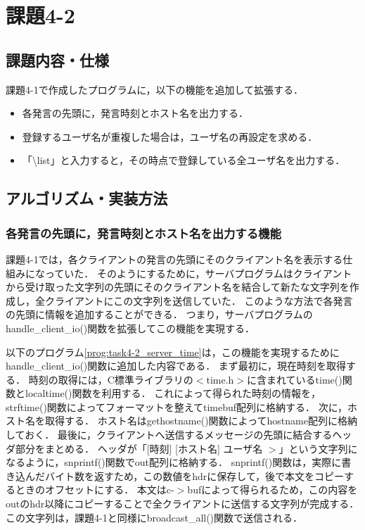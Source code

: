 \documentclass[a4j,10pt]{jarticle}
\begin{document}
\section{課題4-2}
\subsection{課題内容・仕様}
課題4-1で作成したプログラムに，以下の機能を追加して拡張する．
\begin{itemize}
  \item 各発言の先頭に，発言時刻とホスト名を出力する．
  \item 登録するユーザ名が重複した場合は，ユーザ名の再設定を求める．
  \item 「\textbackslash list」と入力すると，その時点で登録している全ユーザ名を出力する．
\end{itemize}

\subsection{アルゴリズム・実装方法}
\subsubsection{各発言の先頭に，発言時刻とホスト名を出力する機能}
課題4-1では，各クライアントの発言の先頭にそのクライアント名を表示する仕組みになっていた．
そのようにするために，サーバプログラムはクライアントから受け取った文字列の先頭にそのクライアント名を結合して新たな文字列を作成し，全クライアントにこの文字列を送信していた．
このような方法で各発言の先頭に情報を追加することができる．
つまり，サーバプログラムのhandle\_client\_io()関数を拡張してこの機能を実現する．

以下のプログラム\ref{prog:task4-2_server_time}は，この機能を実現するためにhandle\_client\_io()関数に追加した内容である．
まず最初に，現在時刻を取得する．
時刻の取得には，C標準ライブラリの$<$time.h$>$に含まれているtime()関数とlocaltime()関数を利用する．
これによって得られた時刻の情報を，strftime()関数によってフォーマットを整えてtimebuf配列に格納する．
次に，ホスト名を取得する．
ホスト名はgethostname()関数によってhostname配列に格納しておく．
最後に，クライアントへ送信するメッセージの先頭に結合するヘッダ部分をまとめる．
ヘッダが「[時刻] [ホスト名] ユーザ名 $>$」という文字列になるように，snprintf()関数でout配列に格納する．
snprintf()関数は，実際に書き込んだバイト数を返すため，この数値をhdrに保存して，後で本文をコピーするときのオフセットにする．
本文はc-$>$bufによって得られるため，この内容をoutのhdr以降にコピーすることで全クライアントに送信する文字列が完成する．
この文字列は，課題4-1と同様にbroadcast\_all()関数で送信される．
\end{document}
